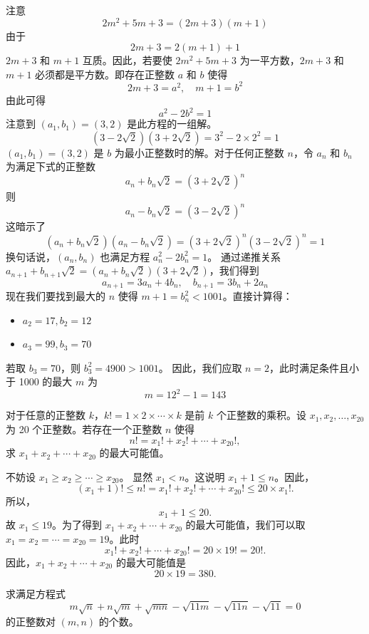\begin{questions}
\begin{solution}
注意
\[ 2m^2 + 5m + 3 = (2m + 3)(m + 1)  \]
由于
\[ 2m + 3 = 2(m + 1) + 1  \]
$2m + 3$ 和 $m + 1$ 互质。因此，若要使 $2m^2 + 5m + 3$ 为一平方数，$2m + 3$ 和 $m + 1$ 必须都是平方数。即存在正整数 $a$ 和 $b$ 使得
\[ 2m + 3 = a^2, \quad m + 1 = b^2  \]
由此可得
\[ a^2 - 2b^2 = 1  \]
注意到 $(a_1, b_1) = (3, 2)$ 是此方程的一组解。
\[ (3 - 2\sqrt{2})(3 + 2\sqrt{2}) = 3^2 - 2 \times 2^2 = 1  \]
$(a_1, b_1) = (3, 2)$ 是 $b$ 为最小正整数时的解。对于任何正整数 $n$，令 $a_n$ 和 $b_n$ 为满足下式的正整数
\[ a_n + b_n\sqrt{2} = (3 + 2\sqrt{2})^n  \]
则
\[ a_n - b_n\sqrt{2} = (3 - 2\sqrt{2})^n  \]
这暗示了
\[ (a_n + b_n\sqrt{2})(a_n - b_n\sqrt{2}) = (3 + 2\sqrt{2})^n (3 - 2\sqrt{2})^n = 1  \]
换句话说，$(a_n, b_n)$ 也满足方程 $a_n^2 - 2b_n^2 = 1$。
通过递推关系 $a_{n+1} + b_{n+1}\sqrt{2} = (a_n + b_n\sqrt{2})(3 + 2\sqrt{2})$，我们得到
\[ a_{n+1} = 3a_n + 4b_n, \quad b_{n+1} = 3b_n + 2a_n  \]
现在我们要找到最大的 $n$ 使得 $m + 1 = b_n^2 < 1001$。直接计算得：
\begin{itemize}
    \item $a_2 = 17, b_2 = 12$
    \item $a_3 = 99, b_3 = 70$
\end{itemize}
若取 $b_3 = 70$，则 $b_3^2 = 4900 > 1001$。
因此，我们应取 $n = 2$，此时满足条件且小于 1000 的最大 $m$ 为
\[ m = 12^2 - 1 = 143  \]
\end{solution}

\question 对于任意的正整数 $k$，$k! = 1 \times 2 \times \cdots \times k$ 是前 $k$ 个正整数的乘积。设 $x_1, x_2, \ldots, x_{20}$ 为 20 个正整数。若存在一个正整数 $n$ 使得
\[
n! = x_1! + x_2! + \cdots + x_{20}!,
\]
求 $x_1 + x_2 + \cdots + x_{20}$ 的最大可能值。

\begin{solution}
不妨设 $x_1 \ge x_2 \ge \cdots \ge x_{20}$。
显然 $x_1 < n$。这说明 $x_1 + 1 \le n$。因此，
\[
(x_1 + 1)! \le n! = x_1! + x_2! + \cdots + x_{20}! \le 20 \times x_1!.
\]
所以，
\[
x_1 + 1 \le 20.
\]
故 $x_1 \le 19$。为了得到 $x_1 + x_2 + \cdots + x_{20}$ 的最大可能值，我们可以取 $x_1 = x_2 = \cdots = x_{20} = 19$。此时
\[
x_1! + x_2! + \cdots + x_{20}! = 20 \times 19! = 20!.
\]
因此，$x_1 + x_2 + \cdots + x_{20}$ 的最大可能值是
\[
20 \times 19 = 380.
\]
\end{solution}

\question 求满足方程式
\[
m\sqrt{n} + n\sqrt{m} + \sqrt{mn} - \sqrt{11m} - \sqrt{11n} - \sqrt{11} = 0
\]
的正整数对 $(m, n)$ 的个数。


\end{questions}
